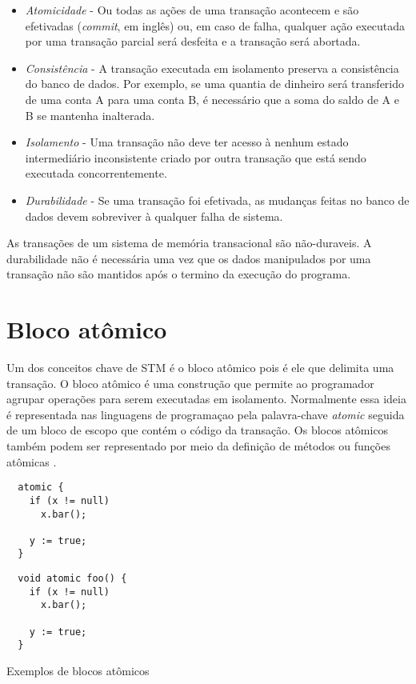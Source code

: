 \begin{itemize}
 \item \emph{Atomicidade} - Ou todas as ações de uma transação acontecem e são efetivadas (\emph{commit}, em inglês) ou, em caso de falha, qualquer ação executada por uma transação parcial será desfeita e a transação será abortada.
 \item \emph{Consistência} - A transação executada em isolamento preserva a consistência do banco de dados. Por exemplo, se uma quantia de dinheiro será transferido de uma conta A para uma conta B, é necessário que a soma do saldo de A e B se mantenha inalterada.
 \item \emph{Isolamento} - Uma transação não deve ter acesso à nenhum estado intermediário inconsistente criado por outra transação que está sendo executada concorrentemente.
 \item \emph{Durabilidade} - Se uma transação foi efetivada, as mudanças feitas no banco de dados devem sobreviver à qualquer falha de sistema.
\end{itemize}

As transações de um sistema de memória transacional são não-duraveis. A durabilidade não é necessária uma vez que os dados manipulados por uma transação não são mantidos após o termino da execução do programa. \cite{harris2010transactional}


\section{Bloco atômico}

Um dos conceitos chave de STM é o bloco atômico pois é ele que delimita uma transação. O bloco atômico é uma construção que permite ao programador agrupar operações para serem executadas em isolamento. Normalmente essa ideia é representada nas linguagens de programaçao pela palavra-chave \emph{atomic} seguida de um bloco de escopo que contém o código da transação. Os blocos atômicos também podem ser representado por meio da definição de métodos ou funções atômicas \cite{harris2010transactional}.

\begin{listing}[!h]
 \begin{minipage}{0.5\textwidth}
  \centering
  \begin{verbatim}
  atomic {
    if (x != null)
      x.bar();
    
    y := true;
  }
  \end{verbatim}
 \end{minipage}
 \begin{minipage}{0.5\textwidth}
  \centering
  \begin{verbatim}
  void atomic foo() {
    if (x != null)
      x.bar();
    
    y := true;
  }
  \end{verbatim}
 \end{minipage}
 \caption{Exemplos de blocos atômicos}
\end{listing}

